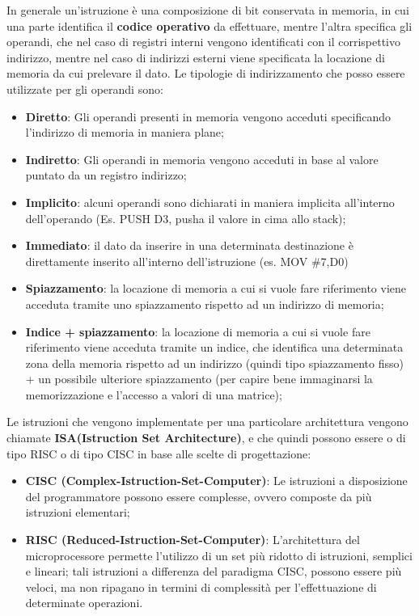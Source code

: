 In generale un'istruzione è una composizione di bit conservata in memoria, in cui una parte identifica il \textbf{codice operativo} da effettuare, mentre l'altra specifica gli operandi, che nel caso di registri interni vengono identificati con il corrispettivo indirizzo, mentre nel caso di indirizzi esterni viene specificata la locazione di memoria da cui prelevare il dato. Le tipologie di indirizzamento che posso essere utilizzate per gli operandi sono:
\begin{itemize}
    \item \textbf{Diretto}: Gli operandi presenti in memoria vengono acceduti specificando l'indirizzo di memoria in maniera plane;
    \item \textbf{Indiretto}: Gli operandi in memoria vengono acceduti in base al valore puntato da un registro indirizzo;
    \item \textbf{Implicito}: alcuni operandi sono dichiarati in maniera implicita all'interno dell'operando (Es. PUSH D3, pusha il valore in cima allo stack);
    \item \textbf{Immediato}: il dato da inserire in una determinata destinazione è direttamente inserito all'interno dell'istruzione (es. MOV \#7,D0)
    \item \textbf{Spiazzamento}: la locazione di memoria a cui si vuole fare riferimento viene acceduta tramite uno spiazzamento rispetto ad un indirizzo di memoria;
    \item \textbf{Indice + spiazzamento}: la locazione di memoria a cui si vuole fare riferimento viene acceduta tramite un indice, che identifica una determinata zona della memoria rispetto ad un indirizzo (quindi tipo spiazzamento fisso) + un possibile ulteriore spiazzamento (per capire bene immaginarsi la memorizzazione e l'accesso a valori di una matrice);
\end{itemize}

Le istruzioni che vengono implementate per una particolare architettura vengono chiamate \textbf{ISA(Istruction Set Architecture)}, e che quindi possono essere o di tipo RISC o di tipo CISC in base alle scelte di progettazione:
\begin{itemize}
    \item \textbf{CISC (Complex-Istruction-Set-Computer)}: Le istruzioni a disposizione del programmatore possono essere complesse, ovvero composte da più istruzioni elementari;
    \item \textbf{RISC (Reduced-Istruction-Set-Computer)}: L'architettura del microprocessore permette l'utilizzo di un set più ridotto di istruzioni, semplici e lineari; tali istruzioni a differenza del paradigma CISC, possono essere più veloci, ma non ripagano in termini di complessità per l'effettuazione di determinate operazioni.
\end{itemize}

